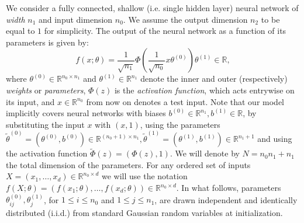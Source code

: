 \documentclass{article}
\theoremstyle{definition}
\newtheorem{ass}{Assumption}
\theoremstyle{remark}
\numberwithin{equation}{section}
\newcommand{\R}{\mathbb{R}}
\begin{document}
We consider a fully connected, shallow (i.e. single hidden layer) neural network of \emph{width} $n_1$ and input dimension $n_0$.
We assume the output dimension $n_2$ to be equal to $1$ for simplicity.
The output of the neural network as a function of its parameters is given by:
\[
f(x;\theta) = \frac{1}{\sqrt{n_{1}}}\Phi\left(\frac{1}{\sqrt{n_0}}x \theta^{(0)}\right) \theta^{(1)} \in \R,
\]
where $\theta^{(0)} \in \R^{n_0 \times n_1}$ and $\theta^{(1)}\in \R^{n_1}$ denote the inner and outer (respectively) \emph{weights} or \emph{parameters}, 
$\Phi(z)$ is the \emph{activation function}, which acts entrywise on its input,
and $x\in \R^{n_0}$ from now on denotes a test input.
Note that our model implicitly covers neural networks with biases $b^{(0)}\in\R^{n_1}, b^{(1)}\in \R$, by substituting the input $x$ with $(x,1)$, using the parameters $\tilde \theta^{(0)} = (\theta^{(0)},b^{(0)}) \in \R^{(n_0+1)\times n_1}, \tilde \theta^{(1)} = (\theta^{(1)},b^{(1)}) \in \R^{n_1+1}$ and using the activation function $\tilde \Phi(z) = (\Phi(z),1)$.
We will denote by $N = n_0n_1+n_1$ the total dimension of the parameters.
For any ordered set of inputs $X=(x_1, \ldots, x_d)\in \R^{n_0\times d}$ we will use the notation $f(X;\theta) = (f(x_1;\theta), \ldots, f(x_d;\theta)) \in \R^{n_0 \times d}$.
In what follows, parameters $\theta^{(0)}_{ij}, \theta^{(1)}_j$, for $1 \le i \le n_0$ and $1 \le j \le n_1$, are drawn independent and identically distributed (i.i.d.) from standard Gaussian random variables at initialization.

\end{document}
